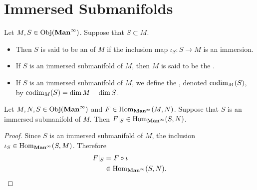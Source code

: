 \documentclass{book}
\begin{document}
	





























\newpage
\section{Immersed Submanifolds}


\begin{defn} 
	Let $M, S \in \operatorname{Obj}(\operatorname*{\text{\textbf{Man}}^{\infty}})$. Suppose that $S \subset M$.
	\begin{itemize}
		\item Then $S$ is said to be an  of $M$ if the inclusion map $\iota_S:S \rightarrow M$ is an immersion.
		\item If $S$ is an immersed submanifold of $M$, then $M$ is said to be the .
		\item If $S$ is an immersed submanifold of $M$, we define the , denoted $\operatorname{codim}_M(S)$, by $\operatorname{codim}_M(S) = \dim M - \dim S$. 
	\end{itemize}
\end{defn}

\begin{ex} 
	Let $M, N, S \in \operatorname{Obj}(\operatorname*{\text{\textbf{Man}}^{\infty}})$ and $F \in \operatorname{Hom}_{\operatorname*{\text{\textbf{Man}}^{\infty}}}(M, N)$. Suppose that $S$ is an immersed submanifold of $M$. Then $F|_S \in \operatorname{Hom}_{\operatorname*{\text{\textbf{Man}}^{\infty}}}(S, N)$.   
\end{ex}

\begin{proof} 
	Since $S$ is an immersed submanifold of $M$, the inclusion $\iota_S \in \operatorname{Hom}_{\operatorname*{\text{\textbf{Man}}^{\infty}}}(S, M)$. Therefore
	\begin{align*}
		F|_S
		& = F \circ \iota \\
		& \in \operatorname{Hom}_{\operatorname*{\text{\textbf{Man}}^{\infty}}}(S, N).
	\end{align*}
\end{proof}
\end{document}
